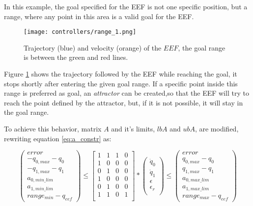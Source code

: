 In this example, the goal specified for the EEF is not one specific position, but a range, where any point in this area is a valid goal for the EEF.
\begin{figure}[H]
	\centering
	\texttt{[image: controllers/range\_1.png]}
	\vspace{-10pt}
	\caption[Position range as goal]{Trajectory (blue) and velocity (orange) of the $EEF$, the goal range is between the green and red lines.}
	\vspace{-15pt}
	\label{fig:range_1}
\end{figure}
Figure \ref{fig:range_1} shows the trajectory followed by the EEF while reaching the goal, it stops shortly after entering the given goal range. If a specific point inside this range is preferred as goal, an \textit{attractor} can be created,so that the EEF will try to reach the point defined by the attractor, but, if it is not possible, it will stay in the goal range.

To achieve this behavior, matrix $A$ and it's limits, $lbA$ and $ubA$, are modified, rewriting equation \ref{eq:a_constr} as:

$$
\left( \begin{array}{c}
error \\
-q_{0,max} - q_{0} \\
-q_{1,max} - q_{1} \\
a_{0,min\_lim} \\
a_{1,min\_lim} \\
range_{min} - q_{eef}
\end{array}
\right)	\leq 
\left[ \begin{array}{cccc}
1 & 1 & 1 & 0 \\
1 & 0 & 0 & 0 \\
0 & 1 & 0 & 0 \\
1 & 0 & 0 & 0 \\
0 & 1 & 0 & 0 \\
1 & 1 & 0 & 1 \\
\end{array}
\right] *
\left( \begin{array}{c}
\dot{q}_{0} \\
\dot{q}_{1} \\
\epsilon \\
\epsilon_r \\
\end{array}
\right) 
\leq \left( \begin{array}{c}
error \\
q_{0,max} - q_{0} \\
q_{1,max} - q_{1} \\
a_{0,max\_lim} \\
a_{1,max\_lim} \\
range_{max} - q_{eef}
\end{array}
\right)
$$

